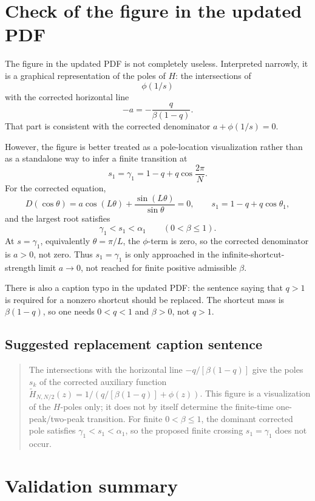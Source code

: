 \documentclass[11pt]{article}
\newcommand{\wt}{\widetilde}
\begin{document}
\section{Check of the figure in the updated PDF}

The figure in the updated PDF is not completely useless.  Interpreted narrowly,
it is a graphical representation of the poles of \(H\): the intersections of
\[
  \phi(1/s)
\]
with the corrected horizontal line
\[
  -a=-\frac{q}{\beta(1-q)}.
\]
That part is consistent with the corrected denominator \(a+\phi(1/s)=0\).

However, the figure is better treated as a pole-location visualization rather
than as a standalone way to infer a finite transition at
\[
  s_1=\gamma_1=1-q+q\cos\frac{2\pi}{N}.
\]
For the corrected equation,
\[
  D(\cos\theta)=a\cos(L\theta)+\frac{\sin(L\theta)}{\sin\theta}=0,
  \qquad
  s_1=1-q+q\cos\theta_1,
\]
and the largest root satisfies
\begin{equation}
  \boxed{\gamma_1<s_1<\alpha_1}
  \qquad (0<\beta\le1).
  \label{eq:s1-between}
\end{equation}
At \(s=\gamma_1\), equivalently \(\theta=\pi/L\), the \(\phi\)-term is zero, so
the corrected denominator is \(a>0\), not zero.  Thus \(s_1=\gamma_1\) is only
approached in the infinite-shortcut-strength limit \(a\to0\), not reached for
finite positive admissible \(\beta\).

There is also a caption typo in the updated PDF: the sentence saying that
\(q>1\) is required for a nonzero shortcut should be replaced.  The shortcut
mass is \(\beta(1-q)\), so one needs \(0<q<1\) and \(\beta>0\), not \(q>1\).

\subsection*{Suggested replacement caption sentence}

\begin{quote}
The intersections with the horizontal line
\(-q/[\beta(1-q)]\) give the poles \(s_k\) of the corrected auxiliary
function \(\wt H_{N,N/2}(z)=1/(q/[\beta(1-q)]+\phi(z))\).  This figure is a
visualization of the \(H\)-poles only; it does not by itself determine the
finite-time one-peak/two-peak transition.  For finite \(0<\beta\le1\), the
dominant corrected pole satisfies \(\gamma_1<s_1<\alpha_1\), so the proposed
finite crossing \(s_1=\gamma_1\) does not occur.
\end{quote}

\section{Validation summary}
\end{document}
